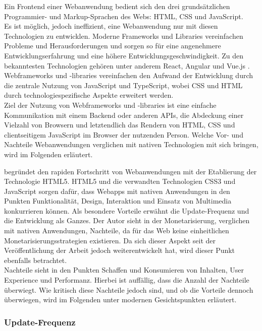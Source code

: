 \documentclass[a4paper]{scrartcl}
\begin{document}
Ein Frontend einer Webanwendung bedient sich den drei grundsätzlichen Programmier- und Markup-Sprachen des Webs: HTML, CSS und JavaScript. \\
Es ist möglich, jedoch ineffizient, eine Webanwendung nur mit diesen Technologien zu entwicklen. Moderne Frameworks und Libraries vereinfachen Probleme und Herausforderungen und sorgen so für eine angenehmere Entwicklungserfahrung und eine höhere Entwicklungsgeschwindigkeit. Zu den bekanntesten Technologien gehören unter anderem React, Angular und Vue.js \autocite{Clement}. Webframeworks und -libraries vereinfachen den Aufwand der Entwicklung durch die zentrale Nutzung von JavaScript und TypeScript, wobei CSS und HTML durch technologiespezifische Aspekte erweitert werden. \\
Ziel der Nutzung von Webframeworks und -libraries ist eine einfache Kommunikation mit einem Backend oder anderen APIs, die Abdeckung einer Vielzahl von Browsern und letztendlich das Rendern von HTML, CSS und clientseitigem JavaScript im Browser der nutzenden Person. Welche Vor- und Nachteile Webanwendungen verglichen mit nativen Technologien mit sich bringen, wird im Folgenden erläutert.

\textcite[27]{Jobe} begründet den rapiden Fortschritt von Webanwendungen mit der Etablierung der Technologie HTML5. HTML5 und die verwandten Technologien CSS3 und JavaScript sorgen dafür, dass Webapps mit nativen Anwendungen in den Punkten Funktionalität, Design, Interaktion und Einsatz von Multimedia konkurrieren können. Als besondere Vorteile erwähnt \textcite[28]{Jobe} die Update-Frequenz und die Entwicklung als Ganzes. Der Autor sieht in der Monetarisierung, verglichen mit nativen Anwendungen, Nachteile, da für das Web keine einheitlichen Monetarisierungsstrategien existieren. Da sich dieser Aspekt seit der Veröffentlichung der Arbeit jedoch weiterentwickelt hat, wird dieser Punkt ebenfalls betrachtet. \\
Nachteile sieht \textcite[28]{Jobe} in den Punkten Schaffen und Konsumieren von Inhalten, User Experience und Performanz. Hierbei ist auffällig, dass die Anzahl der Nachteile überwiegt. Wie kritisch diese Nachteile jedoch sind, und ob die Vorteile dennoch überwiegen, wird im Folgenden unter modernen Gesichtspunkten erläutert. \\

\subsubsection{Update-Frequenz}
\end{document}
